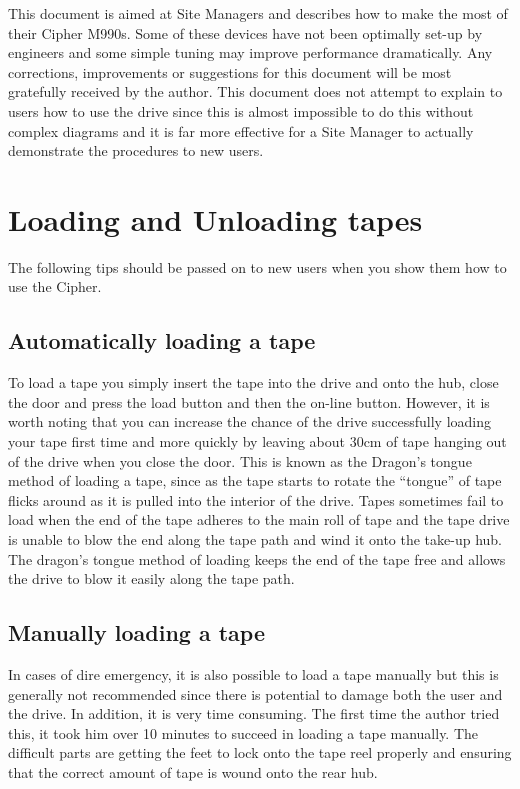 This document is aimed at Site Managers and describes how to make the most of
their Cipher M990s. Some of these devices have not been optimally set-up by
engineers and some simple tuning may improve performance dramatically.
Any corrections, improvements or suggestions for this document will be most
gratefully received by the author. This document does not attempt to explain
to users how to use the drive since this is almost impossible to do this
without complex diagrams and it is far more effective for a Site Manager to
actually demonstrate the procedures to new users.


\section{Loading and Unloading tapes}

The following tips should be passed on to new users when you show them
how to use the Cipher.

\subsection{Automatically loading a tape}

To load a tape you simply insert the tape into the drive and onto the hub,
close the door and press the load button and then the on-line button.  However,
it is worth noting that you can increase the chance of the drive successfully
loading your tape first time and more quickly by leaving about 30cm of tape
hanging out of the drive when you close the door. This is known  as the
Dragon's tongue method of loading a tape, since as the tape starts to  rotate
the ``tongue'' of tape flicks around as it is pulled into the  interior of the
drive. Tapes sometimes fail to load when the end of the tape adheres to the
main roll of tape and the tape drive is unable to  blow the end along the tape
path and wind it onto the take-up hub. The dragon's tongue method of loading
keeps the end of the tape free and allows the drive to blow it easily along the
tape path.

\subsection {Manually loading a tape}

In cases of dire emergency, it is also possible to load a tape manually but
this is generally not recommended since there is potential to damage both the
user and the drive. In addition, it is very time consuming. The first time the
author tried this, it took him over 10 minutes to succeed in loading a tape
manually. The difficult parts are getting the feet to lock onto the tape
reel properly and
ensuring that the correct amount of tape is wound onto the rear hub.

